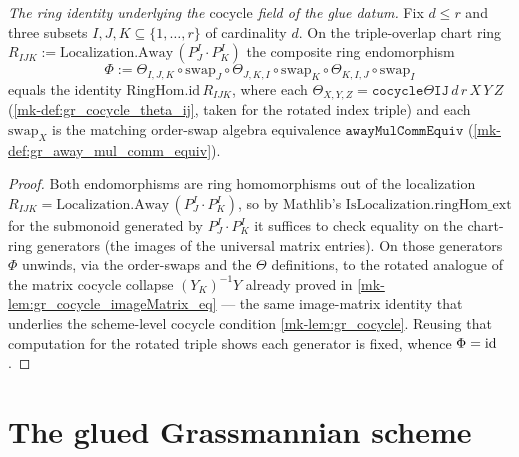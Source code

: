 \begin{lemma}[The rotated triple-overlap ring cocycle identity \(\Phi = \id\)]\label{mk-lem:gr_cocycle_phi_id}
  \leanok

  \textit{The ring identity underlying the \(\mathrm{cocycle}\) field of the glue datum.}
  Fix \(d \le r\) and three subsets \(I,J,K \subseteq \{1,\dots,r\}\) of cardinality \(d\). On the
  triple-overlap chart ring \(R_{IJK} := \mathrm{Localization.Away}\,(P^I_J\cdot P^I_K)\)
  the composite ring endomorphism
  \[
    \Phi := \Theta_{I,J,K} \circ \mathrm{swap}_J \circ \Theta_{J,K,I} \circ \mathrm{swap}_K
            \circ \Theta_{K,I,J} \circ \mathrm{swap}_I
  \]
  equals the identity \(\mathrm{RingHom.id}\,R_{IJK}\), where each \(\Theta_{X,Y,Z} =
  \mathtt{cocycleΘIJ}\,d\,r\,X\,Y\,Z\) (\ref{mk-def:gr_cocycle_theta_ij}, taken for the rotated index
  triple) and each \(\mathrm{swap}_X\) is the matching order-swap algebra equivalence
  \(\mathtt{awayMulCommEquiv}\) (\ref{mk-def:gr_away_mul_comm_equiv}).
\end{lemma}
\begin{proof}
  \leanok
  Both endomorphisms are ring homomorphisms out of the localization
  \(R_{IJK} = \mathrm{Localization.Away}\,(P^I_J\cdot P^I_K)\), so by Mathlib's
  \(\mathrm{IsLocalization.ringHom\_ext}\) for the submonoid generated by
  \(P^I_J\cdot P^I_K\) it suffices to
  check equality on the chart-ring generators (the images of the universal matrix entries). On those
  generators \(\Phi\) unwinds, via the order-swaps and the \(\Theta\) definitions, to the rotated
  analogue of the matrix cocycle collapse \((Y_K)^{-1}Y\) already proved in
  \ref{mk-lem:gr_cocycle_imageMatrix_eq} — the same image-matrix identity that underlies the scheme-level
  cocycle condition \ref{mk-lem:gr_cocycle}. Reusing that computation for the rotated triple shows each
  generator is fixed, whence \(\Phi = \id\).
\end{proof}

\section{The glued Grassmannian scheme}
\label{mk-sec:gr_glued}

